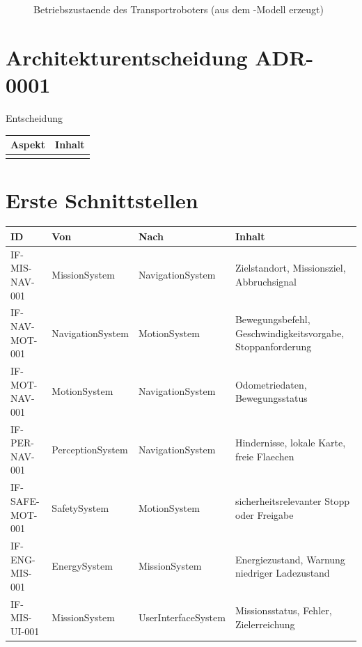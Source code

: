 \begin{figure}
  \centering
  \caption{Betriebszustaende des Transportroboters (aus dem \sysml-Modell erzeugt)}
  \label{fig:operation-states}
\end{figure}

\section{Architekturentscheidung ADR-0001}

\begin{decisionbox}{Entscheidung}%
\end{decisionbox}

\begin{longtable}{L{0.20\textwidth} L{0.64\textwidth}}
\toprule
Aspekt & Inhalt \\
\midrule
{}
\bottomrule
\end{longtable}

\section{Erste Schnittstellen}

\begin{longtable}{L{0.16\textwidth} L{0.20\textwidth} L{0.20\textwidth} L{0.28\textwidth}}
\toprule
ID & Von & Nach & Inhalt \\
\midrule
IF-MIS-NAV-001 & MissionSystem & NavigationSystem & Zielstandort, Missionsziel, Abbruchsignal \\
IF-NAV-MOT-001 & NavigationSystem & MotionSystem & Bewegungsbefehl, Geschwindigkeitsvorgabe, Stoppanforderung \\
IF-MOT-NAV-001 & MotionSystem & NavigationSystem & Odometriedaten, Bewegungsstatus \\
IF-PER-NAV-001 & PerceptionSystem & NavigationSystem & Hindernisse, lokale Karte, freie Flaechen \\
IF-SAFE-MOT-001 & SafetySystem & MotionSystem & sicherheitsrelevanter Stopp oder Freigabe \\
IF-ENG-MIS-001 & EnergySystem & MissionSystem & Energiezustand, Warnung niedriger Ladezustand \\
IF-MIS-UI-001 & MissionSystem & UserInterfaceSystem & Missionsstatus, Fehler, Zielerreichung \\
\bottomrule
\end{longtable}
